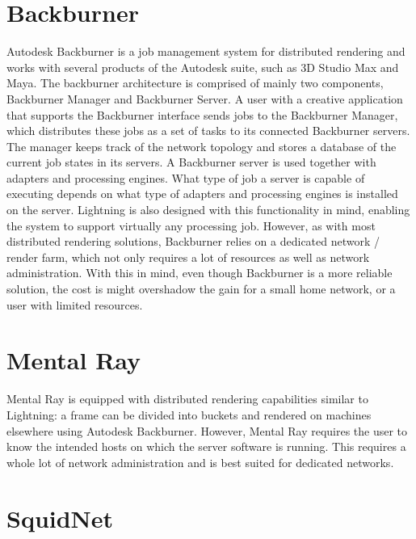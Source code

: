 \section{Backburner}

Autodesk Backburner is a job management system for distributed rendering and works with several products of the Autodesk suite, such as 3D Studio Max and Maya. The backburner architecture is comprised of mainly two components, Backburner Manager and Backburner Server. A user with a creative application that supports the Backburner interface sends jobs to the Backburner Manager, which distributes these jobs as a set of tasks to its connected Backburner servers. The manager keeps track of the network topology and stores a database of the current job states in its servers. A Backburner server is used together with adapters and processing engines. What type of job a server is capable of executing depends on what type of adapters and processing engines is installed on the server. Lightning is also designed with this functionality in mind, enabling the system to support virtually any processing job. However, as with most distributed rendering solutions, Backburner relies on a dedicated network / render farm, which not only requires a lot of resources as well as network administration. With this in mind, even though Backburner is a more reliable solution, the cost is might overshadow the gain for a small home network, or a user with limited resources. 

\section{Mental Ray}


Mental Ray is equipped with distributed rendering capabilities similar to Lightning: a frame can be divided into buckets and rendered on machines elsewhere using Autodesk Backburner. However, Mental Ray requires the user to know the intended hosts on which the server software is running. This requires a whole lot of network administration and is best suited for dedicated networks. 

\section{SquidNet}

